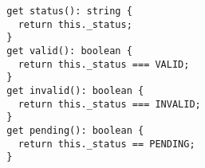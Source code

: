 \begin{verbatim}
  get status(): string {
    return this._status;
  }
  get valid(): boolean {
    return this._status === VALID;
  }
  get invalid(): boolean {
    return this._status === INVALID;
  }
  get pending(): boolean {
    return this._status == PENDING;
  }
\end{verbatim}

